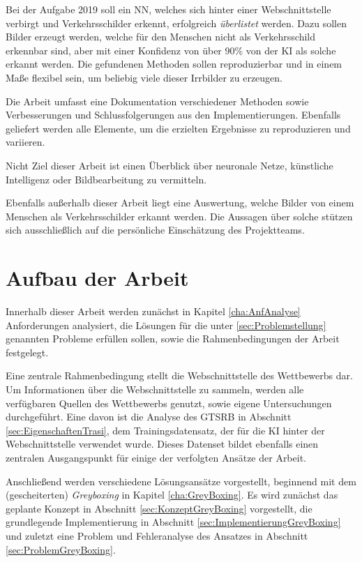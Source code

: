 Bei der Aufgabe 2019 soll ein \ac{NN}, welches sich hinter einer Webschnittstelle verbirgt und Verkehrsschilder erkennt, erfolgreich \textit{überlistet} werden. 
Dazu sollen Bilder erzeugt werden, welche für den Menschen nicht als Verkehrsschild erkennbar sind, aber mit einer Konfidenz von über 90\% von der \ac{KI} als solche erkannt werden. Die gefundenen Methoden sollen reproduzierbar und in einem Maße flexibel sein, um beliebig viele dieser Irrbilder zu erzeugen. 

Die Arbeit umfasst eine Dokumentation verschiedener Methoden sowie Verbesserungen und Schlussfolgerungen aus den Implementierungen. Ebenfalls geliefert werden alle Elemente, um die erzielten Ergebnisse zu reproduzieren und variieren. 

Nicht Ziel dieser Arbeit ist einen Überblick über neuronale Netze, künstliche Intelligenz oder Bildbearbeitung zu vermitteln. 

Ebenfalls außerhalb dieser Arbeit liegt eine Auswertung, welche Bilder von einem Menschen als Verkehrsschilder erkannt werden. 
Die Aussagen über solche stützen sich ausschließlich auf die persönliche Einschätzung des Projektteams. 
\section{Aufbau der Arbeit}
Innerhalb dieser Arbeit werden zunächst in Kapitel \ref{cha:AnfAnalyse} Anforderungen analysiert, die Lösungen für die unter \ref{sec:Problemstellung} genannten Probleme erfüllen sollen, sowie die Rahmenbedingungen der Arbeit festgelegt. 

Eine zentrale Rahmenbedingung stellt die Webschnittstelle des Wettbewerbs dar. 
Um Informationen über die Webschnittstelle zu sammeln, werden alle verfügbaren Quellen des Wettbewerbs genutzt, sowie eigene Untersuchungen durchgeführt. 
Eine davon ist die Analyse des \ac{GTSRB} in Abschnitt \ref{sec:EigenschaftenTrasi}, dem Trainingsdatensatz, der für die \ac{KI} hinter der Webschnittstelle verwendet wurde. 
Dieses Datenset bildet ebenfalls einen zentralen Ausgangspunkt für einige der verfolgten Ansätze der Arbeit.

Anschließend werden verschiedene Lösungsansätze vorgestellt, beginnend mit dem (gescheiterten) \textit{Greyboxing} in Kapitel \ref{cha:GreyBoxing}. Es wird zunächst das geplante Konzept in Abschnitt \ref{sec:KonzeptGreyBoxing} vorgestellt, die grundlegende Implementierung in Abschnitt \ref{sec:ImplementierungGreyBoxing} und zuletzt eine Problem und Fehleranalyse des Ansatzes in Abschnitt \ref{sec:ProblemGreyBoxing}.

